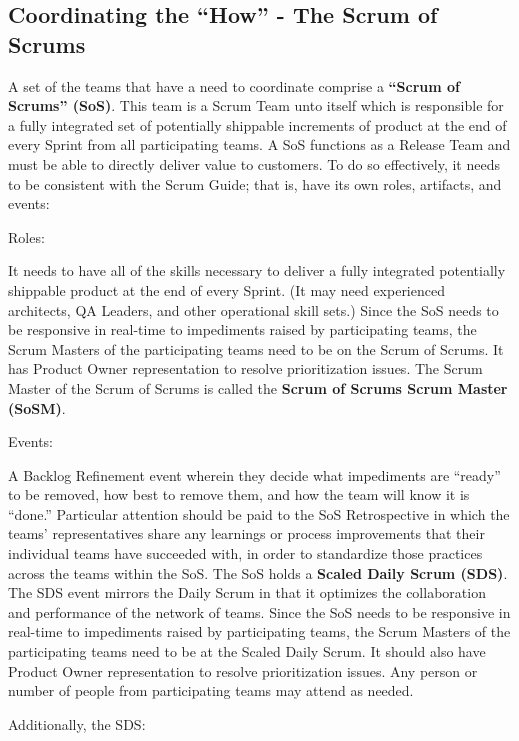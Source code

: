 \documentclass[12pt,a4paper,parskip=full]{scrartcl}
\begin{document}
\subsection{Coordinating the ``How'' - The Scrum of Scrums}
A set of the teams that have a need to coordinate comprise a \textbf{``Scrum of Scrums'' (SoS)}. This team is a Scrum Team unto itself which is responsible for a fully integrated set of potentially shippable increments of product at the end of every Sprint from all participating teams. A SoS functions as a Release Team and must be able to directly deliver value to customers. To do so effectively, it needs to be consistent with the Scrum Guide; that is, have its own roles, artifacts, and events:

Roles:

It needs to have all of the skills necessary to deliver a fully integrated potentially shippable product at the end of every Sprint. (It may need experienced architects, QA Leaders, and other operational skill sets.) Since the SoS needs to be responsive in real-time to impediments raised by participating teams, the Scrum Masters of the participating teams need to be on the Scrum of Scrums.
It has Product Owner representation to resolve prioritization issues.
The Scrum Master of the Scrum of Scrums is called the \textbf{Scrum of Scrums Scrum Master (SoSM)}.

Events:

A Backlog Refinement event wherein they decide what impediments are ``ready'' to be removed, how best to remove them, and how the team will know it is ``done.''
Particular attention should be paid to the SoS Retrospective in which the teams' representatives share any learnings or process improvements that their individual teams have succeeded with, in order to standardize those practices across the teams within the SoS.
The SoS holds a \textbf{Scaled Daily Scrum (SDS)}. The SDS event mirrors the Daily Scrum in that it optimizes the collaboration and performance of the network of teams. Since the SoS needs to be responsive in real-time to impediments raised by participating teams, the Scrum Masters of the participating teams need to be at the Scaled Daily Scrum. It should also have Product Owner representation to resolve prioritization issues. Any person or number of people from participating teams may attend as needed.

Additionally, the SDS:
\end{document}
